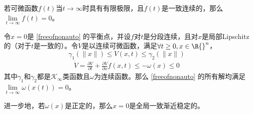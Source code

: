 
\begin{theorem}[Barbalat引理]
    若可微函数$f(t)$当$t\to\infty$时具有有限极限，且$\dot{f}(t)$是一致连续的，那么$\lim\limits_{t\to\infty}\dot{f}(t)=0$。
\end{theorem}
\begin{theorem}
    令$x=0$是 \eqref{freeofnonauto} 的平衡点，并设$f$对$t$是分段连续，且对$x$是局部Lipschitz的（对于$t$是一致的）。令$V$是以连续可微函数，满足$\forall t\ge 0,x\in\R{}^n$，\[\gamma_1(\|x\|)\le V(x,t)\le \gamma_2(\|x\|)\]
    \[\begin{aligned}\dot{V}=\frac{\partial V}{\partial t}+\frac{\partial V}{\partial x}f(x,t)\leq-\omega(x)\leq0\end{aligned}\]
    其中$\gamma_1$和$\gamma_2$都是$\mathcal{K}_\infty$类函数且$\omega$为连续函数。那么  \eqref{freeofnonauto} 的所有解均满足$\lim\limits_{t\to\infty}\omega(x(t))=0$。
    
    进一步地，若$\omega(x)$是正定的，那么$x=0$是全局一致渐近稳定的。
\end{theorem}